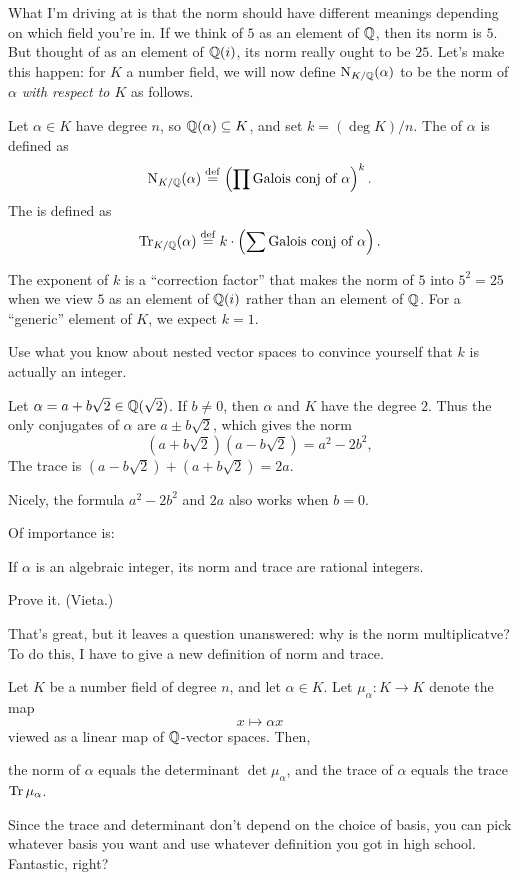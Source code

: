 What I'm driving at is that the norm should have different meanings depending on which field you're in.
If we think of $5$ as an element of $\mathbb Q$, then its norm is $5$.
But thought of as an element of $\mathbb Q(i)$, its norm really ought to be $25$.
Let's make this happen: for $K$ a number field, we will now define $\operatorname{N}_{K/\mathbb Q}(\alpha)$
to be the norm of $\alpha$ \emph{with respect to $K$} as follows.
\begin{definition}
	Let $\alpha \in K$ have degree $n$, so $\mathbb Q(\alpha) \subseteq K$, and set $k = (\deg K) / n$.
	The  of $\alpha$ is defined as
	\[ \operatorname{N}_{K/\mathbb Q}(\alpha) \overset{\mathrm{def}}{=} \left( \prod \text{Galois conj of $\alpha$} \right)^k. \]
	The  is defined as
	\[ \operatorname{Tr}_{K/\mathbb Q}(\alpha) \overset{\mathrm{def}}{=} k \cdot \left( \sum \text{Galois conj of $\alpha$} \right). \]
\end{definition}
The exponent of $k$ is a ``correction factor'' that makes the norm of $5$ into $5^2=25$
when we view $5$ as an element of $\mathbb Q(i)$ rather than an element of $\mathbb Q$.
For a ``generic'' element of $K$, we expect $k = 1$.
\begin{exercise}
	Use what you know about nested vector spaces to convince
	yourself that $k$ is actually an integer.
\end{exercise}
\begin{example}
	Let $\alpha = a+b\sqrt2 \in \mathbb Q(\sqrt2)$.
	If $b \neq 0$, then $\alpha$ and $K$ have the degree $2$.
	Thus the only conjugates of $\alpha$ are $a \pm b\sqrt2$, which gives
	the norm \[ (a+b\sqrt2)(a-b\sqrt2) = a^2-2b^2, \]
	The trace is $(a-b\sqrt2) + (a+b\sqrt2) = 2a$.

	Nicely, the formula $a^2-2b^2$ and $2a$ also works when $b=0$.
\end{example}
Of importance is:
\begin{proposition}
	If $\alpha$ is an algebraic integer, its norm and trace
	are rational integers.
\end{proposition}
\begin{ques}
	Prove it. (Vieta.)
\end{ques}

That's great, but it leaves a question unanswered:
why is the norm multiplicatve?
To do this, I have to give a new definition of norm and trace.

\begin{theorem}
	Let $K$ be a number field of degree $n$, and let $\alpha \in K$.
	Let $\mu_\alpha : K \to K$ denote the map \[ x \mapsto \alpha x \]
	viewed as a linear map of $\mathbb Q$-vector spaces.
	Then,
	\begin{itemize}
		\ii the norm of $\alpha$ equals the determinant $\det \mu_\alpha$, and
		\ii the trace of $\alpha$ equals the trace $\operatorname{Tr} \mu_\alpha$.
	\end{itemize} 
\end{theorem}
Since the trace and determinant don't depend on the choice of basis,
you can pick whatever basis you want
and use whatever definition you got in high school.
Fantastic, right?

